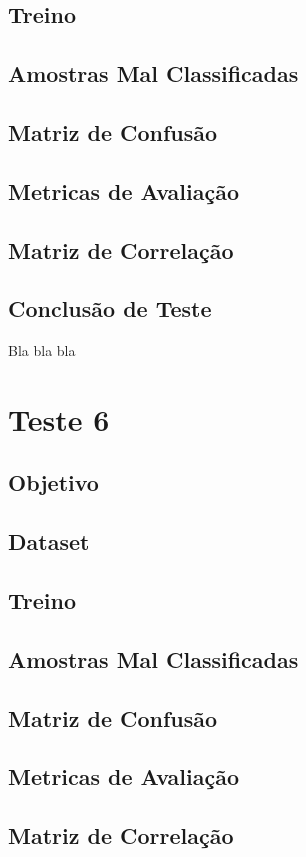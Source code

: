 \subsection{Treino}
\subsection{Amostras Mal Classificadas}
\subsection{Matriz de Confusão}
\subsection{Metricas de Avaliação}
\subsection{Matriz de Correlação}
\subsection{Conclusão de Teste}
    Bla bla bla


\section{Teste 6}
\subsection{Objetivo}
\subsection{Dataset}
\subsection{Treino}
\subsection{Amostras Mal Classificadas}
\subsection{Matriz de Confusão}
\subsection{Metricas de Avaliação}
\subsection{Matriz de Correlação}
